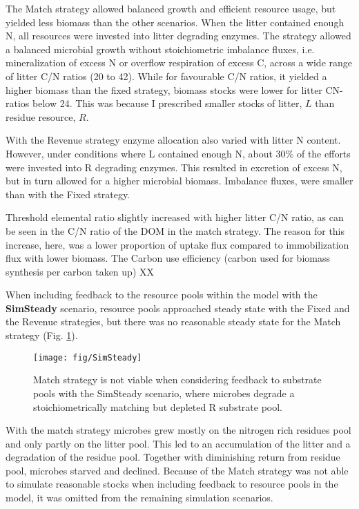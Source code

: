 The Match strategy allowed balanced growth and efficient resource usage, but
yielded less biomass than the other scenarios. When the litter contained enough
N, all resources were invested into litter degrading enzymes. The strategy
allowed a balanced microbial growth without stoichiometric imbalance fluxes,
i.e. mineralization of excess N or overflow respiration of excess C, across a
wide range of litter C/N ratios (20 to 42). While for favourable C/N ratios, it
yielded a higher biomass than the fixed strategy, biomass stocks were lower for
litter CN-ratios below 24. This was because I prescribed smaller stocks of
litter, $L$ than residue resource, $R$. 

With the Revenue strategy enzyme allocation also varied with litter N content.
However, under conditions where L contained enough N, about 30\% of the efforts
were invested into R degrading enzymes. This resulted in excretion of
excess N, but in turn allowed for a higher microbial biomass. Imbalance fluxes,
were smaller than with the Fixed strategy.

Threshold elemental ratio slightly increased with higher litter C/N ratio, as
can be seen in the C/N ratio of the DOM in the match strategy. The reason for this
increase, here, was a lower proportion of uptake flux compared to immobilization
flux with lower biomass.
The Carbon use efficiency (carbon used for biomass synthesis per
carbon taken up) XX

When including feedback to the resource pools within the model with the
\textbf{SimSteady} scenario, resource pools approached steady state with the
Fixed and the Revenue strategies, but there was no reasonable steady state for
the Match strategy (Fig. \ref{fig:SimSteady}).

\begin{figure}[t]
\vspace*{2mm}
\begin{center} 
\texttt{[image: fig/SimSteady]} 
\end{center}
\caption{Match strategy is not viable when considering feedback to
substrate pools with the SimSteady scenario, where microbes degrade a
stoichiometrically matching but depleted R substrate pool.
\label{fig:SimSteady}} 
\end{figure}

With the match strategy microbes grew mostly on the
nitrogen rich residues pool and only partly on the litter pool. This led to an
accumulation of the litter and a degradation of the residue pool. Together with
diminishing return from residue pool, microbes starved and declined.
Because of the Match strategy was not able to simulate reasonable
stocks when including feedback to resource pools in the model, it was omitted
from the remaining simulation scenarios.

